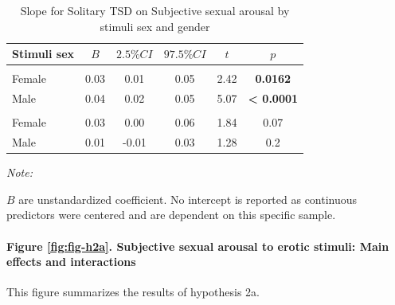 \documentclass[
  bookmarksnumbered]{article}
\begin{document}
\begin{table}[H]
\centering
\caption{\label{tab:unnamed-chunk-22}Slope for Solitary TSD on 
        Subjective sexual arousal by stimuli sex and gender}
\centering
\begin{threeparttable}
\begin{tabular}[t]{lccccc}
\toprule
Stimuli sex & $B$ & $2.5\% CI$ & $97.5\% CI$ & $t$ & $p$\\
\midrule
\addlinespace[0.3em]
\multicolumn{6}{l}{\cellcolor{lightgray}{Gender: Women}}\\
\hspace{1em}Female & 0.03 & 0.01 & 0.05 & 2.42 & \textbf{0.0162}\\
\hspace{1em}Male & 0.04 & 0.02 & 0.05 & 5.07 & \textbf{< 0.0001}\\
\addlinespace[0.3em]
\multicolumn{6}{l}{\cellcolor{lightgray}{Gender: Men}}\\
\hspace{1em}Female & 0.03 & 0.00 & 0.06 & 1.84 & 0.07\\
\hspace{1em}Male & 0.01 & -0.01 & 0.03 & 1.28 & 0.2\\
\bottomrule
\end{tabular}
\begin{tablenotes}[para]
\item \textit{Note: } 
\item $B$ are unstandardized coefficient.
           No intercept is reported as continuous predictors were centered
           and are dependent on this specific sample.
\end{tablenotes}
\end{threeparttable}
\end{table}

\paragraph{Figure \ref{fig:fig-h2a}. Subjective sexual arousal to erotic stimuli: Main effects and interactions}\label{figure-reffigfig-h2a.-subjective-sexual-arousal-to-erotic-stimuli-main-effects-and-interactions}

This figure summarizes the results of hypothesis 2a.
\end{document}
